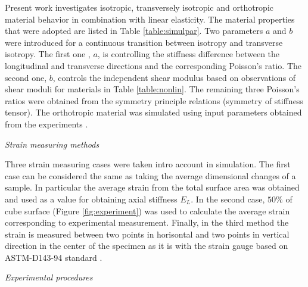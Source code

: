 \documentclass[review]{elsarticle}
\begin{document}
Present work investigates isotropic, transversely isotropic and orthotropic
material behavior in combination with linear elasticity.
The material properties that were adopted are listed in
Table \ref{table:simulpar}. Two parameters $a$ and $b$ were introduced for a continuous transition between isotropy and transverse isotropy. 
The first one , $a$, is controlling the stiffness difference between the
longitudinal and transverse directions and the corresponding Poisson's ratio.
The second one, $b$, controls the independent shear modulus based on
observations of shear moduli for materials in Table \ref{table:nonlin}.
The remaining three Poisson's ratios were obtained from the symmetry
principle relations (symmetry of stiffness tensor\cite{hyer2009stress}). The
orthotropic material was simulated using input parameters obtained from the experiments \cite{vorobyevcharacterisation}.


\begin{description}
\item{\textit{Strain measuring methods}}
\end{description}


Three strain measuring cases were taken intro account in simulation. The first
case can be considered the same as taking the average dimensional changes of a
sample. In particular the average strain from the total surface area was
obtained and used as a value for obtaining axial stiffness $E_L$. In the
second case, $50\%$ of cube surface (Figure \ref{fig:experiment}) was
used to calculate the average strain corresponding to experimental measurement. 
Finally, in the third method the strain is measured between two points
in horisontal and two points in vertical direction in the center of the specimen
as it is with the strain gauge based on ASTM-D143-94 standard
\cite{american2009standard}.

\begin{description}
\item{\textit{Experimental procedures}}
\end{description}
\end{document}

